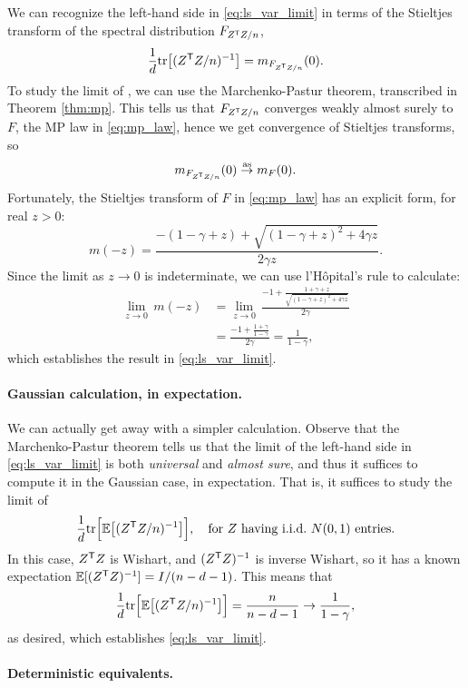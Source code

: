 \documentclass{article}
\begin{document}
We can recognize the left-hand side in \eqref{eq:ls_var_limit} in terms of the
Stieltjes transform of the spectral distribution $F_{Z^{\mathsf{T}} Z/n}$,  
\[
\frac{1}{d} \mathrm{tr} \big[ (Z^{\mathsf{T}} Z/n)^{-1} \big] = m_{F_{Z^{\mathsf{T}} Z/n}}(0).
\]
To study the limit of , we can use the
Marchenko-Pastur theorem, transcribed in Theorem \ref{thm:mp}. This tells us
that $F_{Z^{\mathsf{T}} Z/n}$ converges weakly almost surely to $F$, the MP law in
\eqref{eq:mp_law}, hence we get convergence of Stieltjes transforms, so     
\[
m_{F_{Z^{\mathsf{T}} Z/n}}(0) \overset{\mathrm{as}}{\to} m_F(0).
\]
Fortunately, the Stieltjes transform of $F$ in \eqref{eq:mp_law} has an explicit
form, for real $z>0$:    
\begin{equation}
\label{eq:mp_stieltjes}
m(-z) = \frac{-(1 - \gamma + z) + \sqrt{(1 - \gamma + z)^2 + 4 \gamma z}}{2
  \gamma z}. 
\end{equation}
Since the limit as $z \to 0$ is indeterminate, we can use l'H{\^o}pital's rule
to calculate:   
\begin{align*}
\lim_{z \to 0} \, m(-z) 
&= \lim_{z \to 0} \, \frac{-1 + \frac{1+\gamma+z}
  {\sqrt{(1-\gamma+z)^2 + 4\gamma z}}}{2\gamma} \\
&= \frac{-1+\frac{1+\gamma}{1-\gamma}}{2\gamma} 
= \frac{1}{1-\gamma},
\end{align*}
which establishes the result in \eqref{eq:ls_var_limit}. 

\paragraph{Gaussian calculation, in expectation.} 

We can actually get away with a simpler calculation. Observe that the
Marchenko-Pastur theorem tells us that the limit of the left-hand side in
\eqref{eq:ls_var_limit} is both \emph{universal} and \emph{almost sure}, and
thus it suffices to compute it in the Gaussian case, in expectation. That is, it 
suffices to study the limit of
\[
\frac{1}{d} \mathrm{tr} \Big[ \mathbb{E}\big[ (Z^{\mathsf{T}} Z/n)^{-1} \big] \Big], \quad \text{for $Z$ 
  having i.i.d.\ $N(0,1)$ entries.}
\]
In this case, $Z^{\mathsf{T}} Z$ is Wishart, and $(Z^{\mathsf{T}} Z)^{-1}$ is inverse Wishart, so it
has a known expectation $\mathbb{E}[(Z^{\mathsf{T}} Z)^{-1}] = I/(n-d-1)$. This means that
\[
\frac{1}{d} \mathrm{tr} \Big[ \mathbb{E}\big[ (Z^{\mathsf{T}} Z/n)^{-1} \big] \Big] = \frac{n}{n-d-1} \to
\frac{1}{1-\gamma}, 
\]
as desired, which establishes \eqref{eq:ls_var_limit}.

\paragraph{Deterministic equivalents.}
\end{document}
